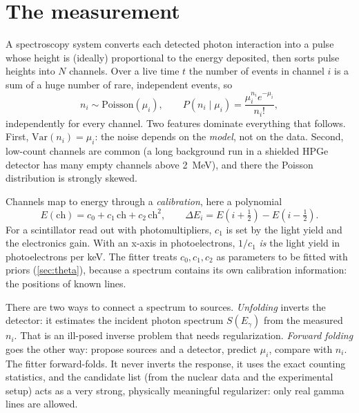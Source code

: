 \documentclass[11pt]{article}
\begin{document}
\section{The measurement}\label{sec:measurement}
A spectroscopy system converts each detected photon interaction into a pulse whose height is (ideally) proportional to the energy deposited, then sorts pulse heights into $N$ channels. Over a live time $t$ the number of events in channel $i$ is a sum of a huge number of rare, independent events, so
\begin{equation}
n_i \sim \mathrm{Poisson}(\mu_i), \qquad P(n_i\mid\mu_i) = \frac{\mu_i^{n_i}e^{-\mu_i}}{n_i!}, \label{eq:poisson}
\end{equation}
independently for every channel. Two features dominate everything that follows. First, $\mathrm{Var}(n_i) = \mu_i$: the noise depends on the \emph{model}, not on the data. Second, low-count channels are common (a long background run in a shielded HPGe detector has many empty channels above \SI{2}{MeV}), and there the Poisson distribution is strongly skewed.

Channels map to energy through a \emph{calibration}, here a polynomial
\begin{equation}
E(\mathrm{ch}) = c_0 + c_1\,\mathrm{ch} + c_2\,\mathrm{ch}^2,\qquad \Delta E_i = E(i+\tfrac12) - E(i-\tfrac12). \label{eq:calib}
\end{equation}
For a scintillator read out with photomultipliers, $c_1$ is set by the light yield and the electronics gain. With an x-axis in photoelectrons, $1/c_1$ \emph{is} the light yield in photoelectrons per keV. The fitter treats $c_0,c_1,c_2$ as parameters to be fitted with priors (\cref{sec:theta}), because a spectrum contains its own calibration information: the positions of known lines.

\begin{keyidea}
There are two ways to connect a spectrum to sources. \emph{Unfolding} inverts the detector: it estimates the incident photon spectrum $S(E_\gamma)$ from the measured $n_i$. That is an ill-posed inverse problem that needs regularization. \emph{Forward folding} goes the other way: propose sources and a detector, predict $\mu_i$, compare with $n_i$. The fitter forward-folds. It never inverts the response, it uses the exact counting statistics, and the candidate list (from the nuclear data and the experimental setup) acts as a very strong, physically meaningful regularizer: only real gamma lines are allowed.
\end{keyidea}
\end{document}
